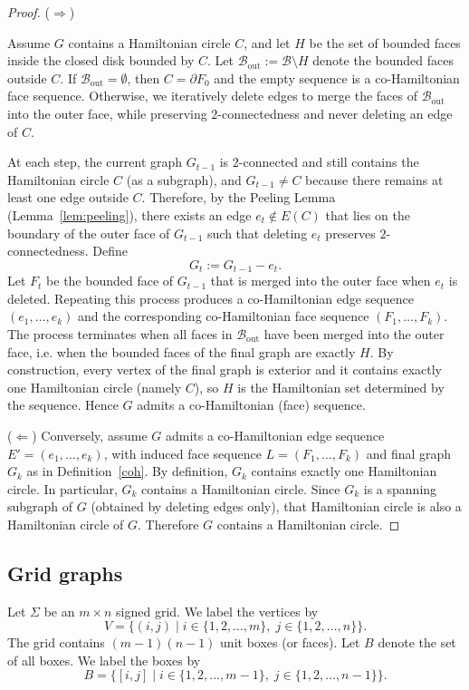 \documentclass[12pt]{amsart}
\theoremstyle{theorem}%
\theoremstyle{definition}%
\begin{document}
\begin{proof}


($\Rightarrow$)

Assume $G$ contains a Hamiltonian circle $C$, and let $H$ be the set of bounded faces inside the closed disk bounded by $C$.
Let $\mathcal{B}_{\mathrm{out}}:=\mathcal{B}\setminus H$ denote the bounded faces outside $C$.
If $\mathcal{B}_{\mathrm{out}}=\emptyset$, then $C=\partial F_0$ and the empty sequence is a co-Hamiltonian face sequence.
Otherwise, we iteratively delete edges to merge the faces of $\mathcal{B}_{\mathrm{out}}$ into the outer face,
while preserving $2$-connectedness and never deleting an edge of $C$.


At each step, the current graph $G_{t-1}$ is $2$-connected and still contains the Hamiltonian circle $C$
(as a subgraph), and $G_{t-1}\neq C$ because there remains at least one edge outside $C$.
Therefore, by the Peeling Lemma (Lemma~\ref{lem:peeling}), there exists an edge
\(e_t \notin E(C)\) that lies on the boundary of the outer face of \(G_{t-1}\)
such that deleting \(e_t\) preserves \(2\)-connectedness.
Define
\[
G_t:=G_{t-1}-e_t .
\]
Let $F_t$ be the bounded face of $G_{t-1}$ that is merged into the outer face when $e_t$ is deleted. Repeating this process  produces a co-Hamiltonian edge sequence
\((e_1,\dots,e_k)\) and the corresponding co-Hamiltonian face sequence
\((F_1,\dots,F_k)\). The process terminates when all faces in $\mathcal{B}_{\mathrm{out}}$ have been merged into the outer face, i.e. when the bounded faces of the final graph are exactly $H$.
By construction, every vertex of the final graph is exterior and it contains exactly one Hamiltonian circle (namely $C$), so $H$ is the Hamiltonian set determined by the sequence.
Hence $G$ admits a co-Hamiltonian (face) sequence.

($\Leftarrow$)
Conversely, assume $G$ admits a co-Hamiltonian edge sequence $E'=(e_1,\dots,e_k)$, with induced face sequence
$L=(F_1,\dots,F_k)$ and final graph $G_k$ as in Definition~\ref{coh}.
By definition, $G_k$ contains exactly one Hamiltonian circle. In particular, $G_k$ contains a Hamiltonian circle.
Since $G_k$ is a spanning subgraph of $G$ (obtained by deleting edges only), that Hamiltonian circle is also a
Hamiltonian circle of $G$.
Therefore $G$ contains a Hamiltonian circle.
\end{proof}




\subsection{Grid graphs}
Let $\Sigma$ be an $m \times n$ signed grid. We label the vertices by
\[
V = \{(i,j) \mid i \in \{1,2,\dots,m\},\; j \in \{1,2,\dots,n\}\}.
\] 
The grid contains $(m-1)(n-1)$ unit boxes (or faces). 
Let $B$ denote the set of all boxes. 
We label the boxes by
\[
B = \{[i,j] \mid i \in \{1,2,\dots,m-1\},\; j \in \{1,2,\dots,n-1\}\}.
\]
\end{document}
